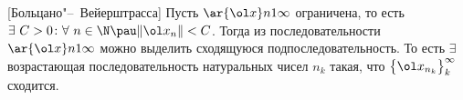 [Больцано"--~Вейерштрасса]\label{B-V}
	 Пусть $\ar {\ol x}n1\infty$ ограничена, то есть $\exists\ C>0\colon \forall\ n\in\N\pau \|\ol x_n\|<C$.
	 Тогда из последовательности $\ar{\ol x}n1\infty$ можно выделить сходящуюся подпоследовательность.
	 То есть $\exists$ возрастающая последовательность натуральных чисел $n_k$ такая, что $\big\{\ol x_{n_k}\big\}_k^\infty$
	 сходится.
	 